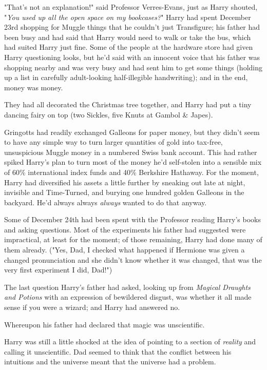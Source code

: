 "That's not an explanation!" said Professor Verres-Evans, just as Harry
shouted, "\emph{You used up all the open space on my bookcases?}"
\sbreak
Harry had spent December 23rd shopping for Muggle things that he
couldn't just Transfigure; his father had been busy and had said that Harry
would need to walk or take the bus, which had suited Harry just fine. Some of
the people at the hardware store had given Harry questioning looks, but he'd
said with an innocent voice that his father was shopping nearby and was very
busy and had sent him to get some things (holding up a list in carefully
adult-looking half-illegible handwriting); and in the end, money was money.

They had all decorated the Christmas tree together, and Harry had put a tiny
dancing fairy on top (two Sickles, five Knuts at Gambol \& Japes).

Gringotts had readily exchanged Galleons for paper money, but they didn't seem
to have any simple way to turn larger quantities of gold into tax-free,
unsuspicious Muggle money in a numbered Swiss bank account. This had rather
spiked Harry's plan to turn most of the money he'd self-stolen into a sensible
mix of 60\% international index funds and 40\% Berkshire Hathaway. For the
moment, Harry had diversified his assets a little further by sneaking out late
at night, invisible and Time-Turned, and burying one hundred golden Galleons in
the backyard. He'd always always \emph{always} wanted to do that anyway.

Some of December 24th had been spent with the Professor reading Harry's books
and asking questions. Most of the experiments his father had suggested were
impractical, at least for the moment; of those remaining, Harry had done many
of them already. ("Yes, Dad, I checked what happened if Hermione was given a
changed pronunciation and she didn't know whether it was changed, that was the
very first experiment I did, Dad!")

The last question Harry's father had asked, looking up from \emph{Magical
Draughts and Potions} with an expression of bewildered disgust, was whether it
all made sense if you were a wizard; and Harry had answered no.

Whereupon his father had declared that magic was unscientific.

Harry was still a little shocked at the idea of pointing to a section of
\emph{reality} and calling it unscientific. Dad seemed to think that the
conflict between his intuitions and the universe meant that the universe had a
problem.

